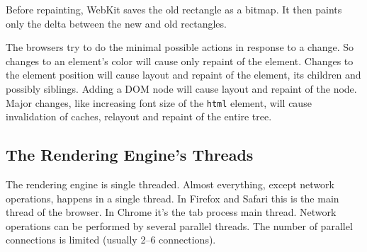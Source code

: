 \documentclass[a4paper, justified, notoc]{tufte-handout} %
\begin{document}
Before repainting, WebKit saves the old rectangle as a bitmap. It then paints only the delta between the new and old rectangles. 

The browsers try to do the minimal possible actions in response to a change. So changes to an element's color will cause only repaint of the element. Changes to the element position will cause layout and repaint of the element, its children and possibly siblings. Adding a DOM node will cause layout and repaint of the node. Major changes, like increasing font size of the \texttt{html} element, will cause invalidation of caches, relayout and repaint of the entire tree.

\subsection{The Rendering Engine's Threads} %
\label{sub:the_rendering_engine_s_threads}

The rendering engine is single threaded. Almost everything, except network operations, happens in a single thread. In Firefox and Safari this is the main thread of the browser. In Chrome it's the tab process main thread. 
Network operations can be performed by several parallel threads. The number of parallel connections is limited (usually 2–6 connections).
\end{document}
